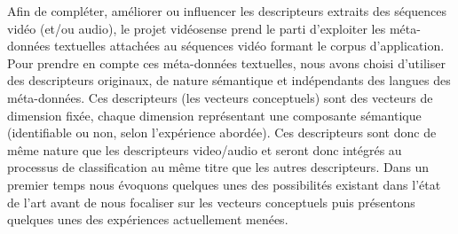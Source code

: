 Afin de compléter, améliorer ou influencer les descripteurs extraits des séquences vidéo (et/ou audio), le projet vidéosense prend le parti d'exploiter les méta-données textuelles attachées au séquences vidéo formant le corpus d'application. Pour prendre en compte ces méta-données textuelles, nous avons choisi d'utiliser des descripteurs originaux, de nature sémantique et indépendants des langues des méta-données. Ces descripteurs (les vecteurs conceptuels) sont des vecteurs de dimension fixée, chaque dimension représentant une composante sémantique (identifiable ou non, selon l'expérience abordée). Ces descripteurs sont donc de même nature que les descripteurs video/audio et seront donc intégrés au processus de classification au même titre que les autres descripteurs. Dans un premier temps nous évoquons quelques unes des possibilités existant dans l'état de l'art avant de nous focaliser sur les vecteurs conceptuels puis présentons quelques unes des expériences actuellement menées.